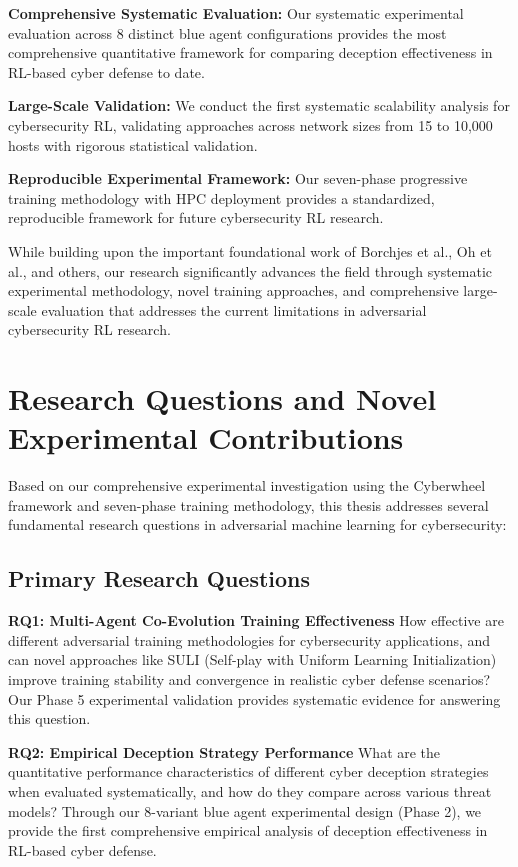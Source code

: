 \documentclass[11pt]{article}
\newcounter{phase}[algorithm]
\theoremstyle{definition}
\theoremstyle{plain}
\begin{document}
\textbf{Comprehensive Systematic Evaluation:} Our systematic experimental evaluation across 8 distinct blue agent configurations provides the most comprehensive quantitative framework for comparing deception effectiveness in RL-based cyber defense to date.

\textbf{Large-Scale Validation:} We conduct the first systematic scalability analysis for cybersecurity RL, validating approaches across network sizes from 15 to 10,000 hosts with rigorous statistical validation.

\textbf{Reproducible Experimental Framework:} Our seven-phase progressive training methodology with HPC deployment provides a standardized, reproducible framework for future cybersecurity RL research.

While building upon the important foundational work of Borchjes et al., Oh et al., and others, our research significantly advances the field through systematic experimental methodology, novel training approaches, and comprehensive large-scale evaluation that addresses the current limitations in adversarial cybersecurity RL research.

\section{Research Questions and Novel Experimental Contributions}

Based on our comprehensive experimental investigation using the Cyberwheel framework and seven-phase training methodology, this thesis addresses several fundamental research questions in adversarial machine learning for cybersecurity:

\subsection{Primary Research Questions}

\textbf{RQ1: Multi-Agent Co-Evolution Training Effectiveness} 
How effective are different adversarial training methodologies for cybersecurity applications, and can novel approaches like SULI (Self-play with Uniform Learning Initialization) improve training stability and convergence in realistic cyber defense scenarios? Our Phase 5 experimental validation provides systematic evidence for answering this question.

\textbf{RQ2: Empirical Deception Strategy Performance}
What are the quantitative performance characteristics of different cyber deception strategies when evaluated systematically, and how do they compare across various threat models? Through our 8-variant blue agent experimental design (Phase 2), we provide the first comprehensive empirical analysis of deception effectiveness in RL-based cyber defense.
\end{document}
